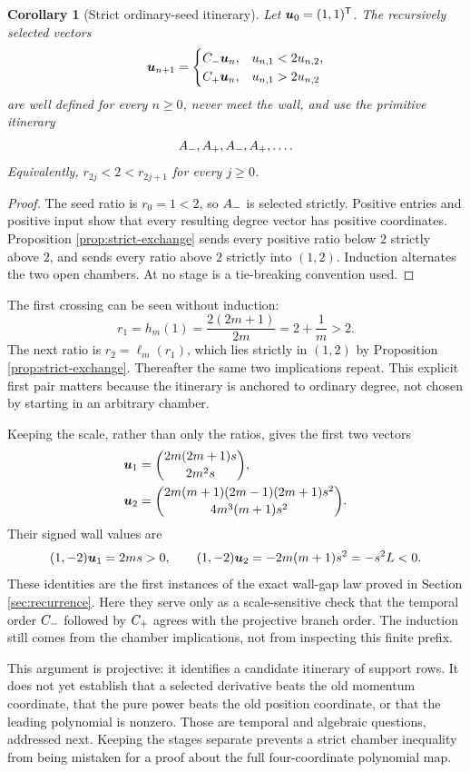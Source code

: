 \documentclass[11pt]{article}
\newtheorem{corollary}[theorem]{Corollary}
\theoremstyle{definition}
\theoremstyle{remark}
\begin{document}
\begin{corollary}[Strict ordinary-seed itinerary]
\label{cor:seed-itinerary}
Let \(\boldsymbol{u}_0=(1,1)^{\mathsf{T}}\).  The recursively selected vectors
\[
\boldsymbol{u}_{n+1}=\begin{cases}
C_{-}\boldsymbol{u}_n,&u_{n,1}<2u_{n,2},\\
C_{+}\boldsymbol{u}_n,&u_{n,1}>2u_{n,2}
\end{cases}
\]
are well defined for every \(n\geq0\), never meet the wall, and use the
primitive itinerary
\[
A_{-},A_{+},A_{-},A_{+},\ldots.
\]
Equivalently, \(r_{2j}<2<r_{2j+1}\) for every \(j\geq0\).
\end{corollary}

\begin{proof}
The seed ratio is \(r_0=1<2\), so \(A_{-}\) is selected strictly.  Positive
entries and positive input show that every resulting degree vector has
positive coordinates.  Proposition \ref{prop:strict-exchange} sends every
positive ratio below \(2\) strictly above \(2\), and sends every ratio above
\(2\) strictly into \((1,2)\).  Induction alternates the two open chambers.
At no stage is a tie-breaking convention used.
\end{proof}

The first crossing can be seen without induction:
\[
r_1=h_m(1)=\frac{2(2m+1)}{2m}=2+\frac1m>2.
\]
The next ratio is \(r_2=\ell_m(r_1)\), which lies strictly in \((1,2)\) by
Proposition \ref{prop:strict-exchange}.  Thereafter the same two implications
repeat.  This explicit first pair matters because the itinerary is anchored
to ordinary degree, not chosen by starting in an arbitrary chamber.

Keeping the scale, rather than only the ratios, gives the first two vectors
\begin{align*}
\boldsymbol{u}_1
&=\binom{2m(2m+1)s}{2m^2s},\\
\boldsymbol{u}_2
&=\binom{2m(m+1)(2m-1)(2m+1)s^2}
{4m^3(m+1)s^2}.
\end{align*}
Their signed wall values are
\[
(1,-2)\boldsymbol{u}_1=2ms>0,
\qquad
(1,-2)\boldsymbol{u}_2=-2m(m+1)s^2=-s^2L<0.
\]
These identities are the first instances of the exact wall-gap law proved in
Section \ref{sec:recurrence}.  Here they serve only as a scale-sensitive
check that the temporal order \(C_{-}\) followed by \(C_{+}\) agrees with the
projective branch order.  The induction still comes from the chamber
implications, not from inspecting this finite prefix.

This argument is projective: it identifies a candidate itinerary of support
rows.  It does not yet establish that a selected derivative beats the old
momentum coordinate, that the pure power beats the old position coordinate,
or that the leading polynomial is nonzero.  Those are temporal and
algebraic questions, addressed next.  Keeping the stages separate prevents a
strict chamber inequality from being mistaken for a proof about the full
four-coordinate polynomial map.
\end{document}
